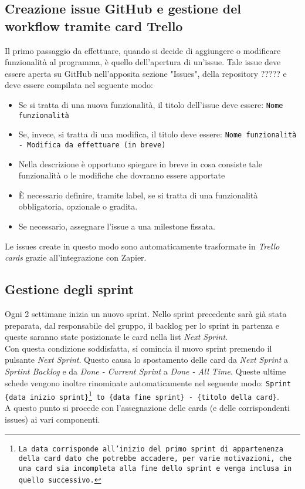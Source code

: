 \subsection{Creazione issue GitHub e gestione del workflow tramite card Trello}
Il primo passaggio da effettuare, quando si decide di aggiungere o modificare funzionalità al programma, è quello dell'apertura di un'issue.
Tale issue deve essere aperta su GitHub nell'apposita sezione "Issues", della repository ????? e deve essere compilata nel seguente modo:
\begin{itemize}
    \item Se si tratta di una nuova funzionalità, il titolo dell'issue deve essere: \texttt{Nome funzionalità}
    \item Se, invece, si tratta di una modifica, il titolo deve essere:
    \texttt{Nome funzionalità - Modifica da effettuare (in breve)}
    \item Nella descrizione è opportuno spiegare in breve in cosa consiste tale funzionalità o le modifiche che dovranno essere apportate
    \item È necessario definire, tramite label, se si tratta di una funzionalità obbligatoria, opzionale o gradita.
    \item Se necessario, assegnare l'issue a una milestone fissata.
\end{itemize}
Le issues create in questo modo sono automaticamente trasformate in \textit{Trello cards} grazie all'integrazione con Zapier.
\subsection{Gestione degli sprint}
Ogni 2 settimane inizia un nuovo sprint. Nello sprint precedente sarà già stata preparata, dal responsabile del gruppo, il backlog per lo sprint in partenza e queste saranno state posizionate le card nella list \textit{Next Sprint}. \\
Con questa condizione soddisfatta, si comincia il nuovo sprint premendo il pulsante \textit{Next Sprint}. Questo causa lo spostamento delle card da \textit{Next Sprint} a \textit{Sprtint Backlog} e da \textit{Done - Current Sprint} a \textit{Done - All Time}. Queste ultime schede vengono inoltre rinominate automaticamente nel seguente modo: \texttt{Sprint \{data inizio sprint\}\footnote{La data corrisponde all'inizio del primo sprint di appartenenza della card dato che potrebbe accadere, per varie motivazioni, che una card sia incompleta alla fine dello sprint e venga inclusa in quello successivo.} to \{data fine sprint\} - \{titolo della card\}}.\\
A questo punto si procede con l'assegnazione delle cards (e delle corrispondenti issues) ai vari componenti.
